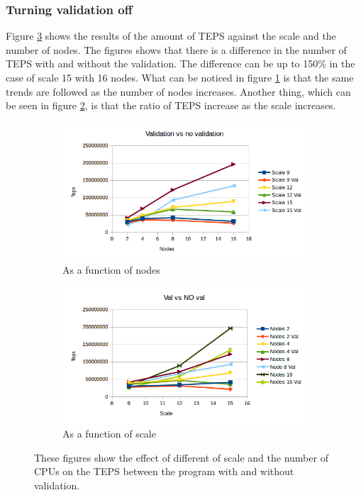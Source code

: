 \subsubsection{Turning validation off}
\label{sec:noval}
 Figure \ref{fig:val_vs_noval} shows the results of the amount of TEPS against the scale and the number of nodes. The figures shows that there is a difference in the number of TEPS with and without the validation. The difference can be up to 150\% in the case of scale 15 with 16 nodes. What can be noticed in figure \ref{fig:nodes_val_noval} is that the same trends are followed as the number of nodes increases. Another thing, which can be seen in figure \ref{fig:scale_val_noval}, is that the ratio of TEPS increase as the scale increases.
\begin{figure}[!h]
\centering
\begin{subfigure}{.5\textwidth}
  \centering
  \includegraphics[width=\linewidth]{images/nodes_scale_vs_noscale.png}
  \caption{As a function of nodes}
  \label{fig:nodes_val_noval}
\end{subfigure}%
\begin{subfigure}{.5\textwidth}
  \centering
  \includegraphics[width=\linewidth]{images/scale_val_vs_noval.png}
  \caption{As a function of scale}
  \label{fig:scale_val_noval}
\end{subfigure}
\caption{These figures show the effect of different of scale and the number of CPUs on the TEPS between the program with and without validation.}
\label{fig:val_vs_noval}
\end{figure}



